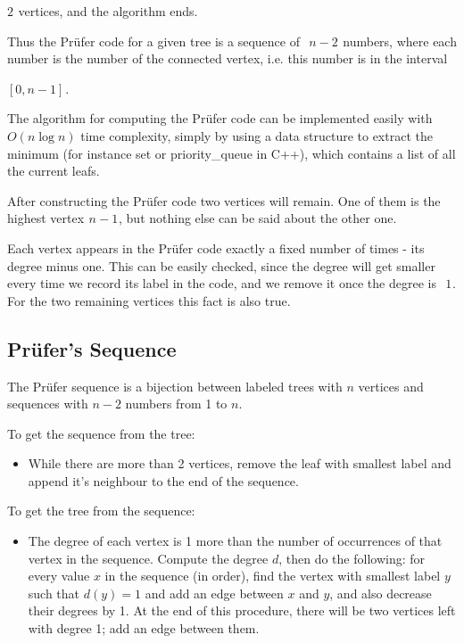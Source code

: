 $2$  vertices, and the algorithm ends.

Thus the Prüfer code for a given tree is a sequence of  
$n - 2$  numbers, where each number is the number of the connected vertex, i.e. this number is in the interval  

$[0, n-1]$ .

The algorithm for computing the Prüfer code can be implemented easily with  
$O(n \log n)$ time complexity, simply by using a data structure to extract the minimum (for instance set or priority\_queue in C++), which contains a list of all the current leafs.

After constructing the Prüfer code two vertices will remain. One of them is the highest vertex  $n-1$ , but nothing else can be said about the other one.

Each vertex appears in the Prüfer code exactly a fixed number of times - its degree minus one. This can be easily checked, since the degree will get smaller every time we record its label in the code, and we remove it once the degree is  
$1$ . For the two remaining vertices this fact is also true.

\subsection{Prüfer's Sequence}
The Prüfer sequence is a bijection between labeled trees with $n$ vertices and sequences with $n-2$ numbers from 1 to $n$.

To get the sequence from the tree:

\begin{itemize}
    \item While there are more than 2 vertices, remove the leaf with smallest label and append it's neighbour to the end of the sequence.
\end{itemize}

To get the tree from the sequence:

\begin{itemize}
    \item The degree of each vertex is 1 more than the number of occurrences of that vertex in the sequence. Compute the degree $d$, then do the following: for every value $x$ in the sequence (in order), find the vertex with smallest label $y$ such that $d(y) = 1$ and add an edge between $x$ and $y$, and also decrease their degrees by 1. At the end of this procedure, there will be two vertices left with degree 1; add an edge between them.
\end{itemize}




